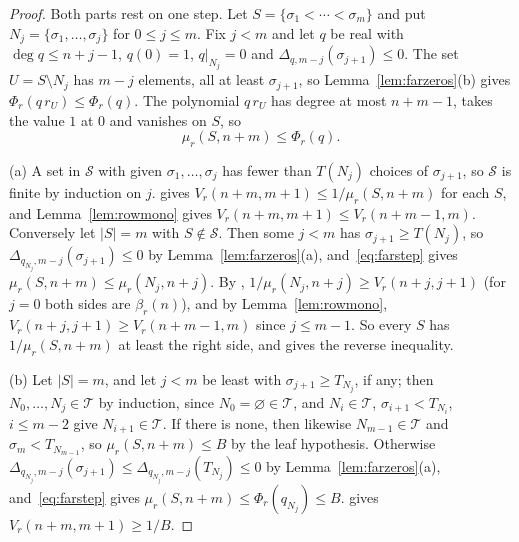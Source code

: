 \documentclass[11pt]{article}
\begin{document}
\begin{proof}
Both parts rest on one step.  Let $S=\{\sigma_1<\cdots<\sigma_m\}$ and
put $N_j=\{\sigma_1,\ldots,\sigma_j\}$ for $0\le j\le m$.  Fix $j<m$ and
let $q$ be real with $\deg q\le n+j-1$, $q(0)=1$, $q|_{N_j}=0$ and
$\Delta_{q,m-j}(\sigma_{j+1})\le0$.  The set
$U=S\setminus N_j$ has $m-j$ elements, all at least $\sigma_{j+1}$, so
Lemma~\ref{lem:farzeros}(b) gives $\Phi_r(q\,r_U)\le\Phi_r(q)$.  The
polynomial $q\,r_U$ has degree at most $n+m-1$, takes the value $1$ at $0$
and vanishes on $S$, so
\begin{equation}\label{eq:farstep}
  \mu_r(S,n+m)\le\Phi_r(q).
\end{equation}

(a) A set in $\mathcal S$ with given $\sigma_1,\ldots,\sigma_j$ has fewer
than $T(N_j)$ choices of $\sigma_{j+1}$, so $\mathcal S$ is finite by
induction on $j$.  \cite[Proposition~2.1(b)]{coefficient-mass-rows} gives
$V_r(n+m,m+1)\le1/\mu_r(S,n+m)$ for each $S$, and Lemma~\ref{lem:rowmono}
gives $V_r(n+m,m+1)\le V_r(n+m-1,m)$.  Conversely let $|S|=m$ with
$S\notin\mathcal S$.  Then some $j<m$ has $\sigma_{j+1}\ge T(N_j)$, so
$\Delta_{q_{N_j},m-j}(\sigma_{j+1})\le0$ by Lemma~\ref{lem:farzeros}(a),
and~\eqref{eq:farstep} gives $\mu_r(S,n+m)\le\mu_r(N_j,n+j)$.  By
\cite[Proposition~2.1(b)]{coefficient-mass-rows}, $1/\mu_r(N_j,n+j)\ge V_r(n+j,j+1)$ (for
$j=0$ both sides are $\beta_r(n)$), and by Lemma~\ref{lem:rowmono},
$V_r(n+j,j+1)\ge V_r(n+m-1,m)$ since $j\le m-1$.  So every $S$ has
$1/\mu_r(S,n+m)$ at least the right side, and
\cite[Proposition~2.1(b)]{coefficient-mass-rows} gives the reverse inequality.

(b) Let $|S|=m$, and let $j<m$ be least with $\sigma_{j+1}\ge T_{N_j}$, if
any; then $N_0,\ldots,N_j\in\mathcal T$ by induction, since
$N_0=\varnothing\in\mathcal T$, and $N_i\in\mathcal T$,
$\sigma_{i+1}<T_{N_i}$, $i\le m-2$ give $N_{i+1}\in\mathcal T$.  If there
is none, then likewise $N_{m-1}\in\mathcal T$ and $\sigma_m<T_{N_{m-1}}$,
so $\mu_r(S,n+m)\le B$ by the leaf hypothesis.  Otherwise
$\Delta_{q_{N_j},m-j}(\sigma_{j+1})\le\Delta_{q_{N_j},m-j}(T_{N_j})\le0$ by
Lemma~\ref{lem:farzeros}(a), and~\eqref{eq:farstep} gives
$\mu_r(S,n+m)\le\Phi_r(q_{N_j})\le B$.  \cite[Proposition~2.1(b)]{coefficient-mass-rows}
gives $V_r(n+m,m+1)\ge1/B$.
\end{proof}
\end{document}
